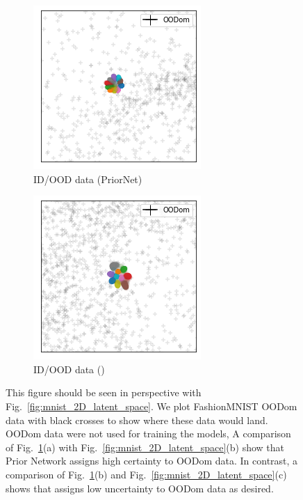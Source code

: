 
\begin{figure}[t!]
    \centering
    \begin{subfigure}[t]{0.46 \columnwidth}
        \centering
        \includegraphics[width=0.5 \textwidth]{sections/006_neurips2020/figures/2D_latent_klpn_3.png}
         \caption{ID/OOD data (PriorNet)}
    \end{subfigure}%
    \begin{subfigure}[t]{0.46 \columnwidth}
        \centering
        \includegraphics[width=0.5 \textwidth]{sections/006_neurips2020/figures/2D_latent_ours_bn_3.png}
         \caption{ID/OOD data (\oursacro)}
    \end{subfigure}%
    \caption{This figure should be seen in perspective with Fig.~\ref{fig:mnist_2D_latent_space}. We plot FashionMNIST OODom data with black crosses to show where these data would land. OODom data were not used for training the models, A comparison of Fig.~\ref{fig:mnist_2D_latent_space_2}(a) with Fig.~\ref{fig:mnist_2D_latent_space}(b) show that Prior Network assigns high certainty to OODom data. In contrast, a comparison of Fig.~\ref{fig:mnist_2D_latent_space_2}(b) and Fig.~\ref{fig:mnist_2D_latent_space}(c) shows that \ours assigns low uncertainty to OODom data as desired.}
    \label{fig:mnist_2D_latent_space_2}
\end{figure}

